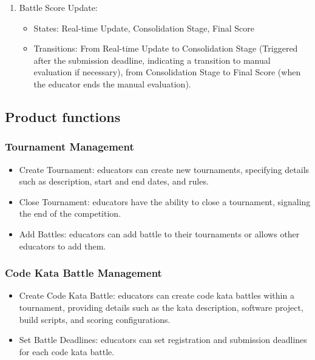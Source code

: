 \begin{enumerate}
    \item Battle Score Update:
        \begin{itemize}
            \item States: Real-time Update, Consolidation Stage, Final Score
            \item Transitions: From Real-time Update to Consolidation Stage (Triggered after the submission deadline, indicating a transition to manual evaluation if necessary), from Consolidation Stage to Final Score (when the educator ends the manual evaluation).
        \end{itemize}

    
\end{enumerate}

\subsection{Product functions}


\subsubsection{Tournament Management}
 \begin{itemize}
    \item Create Tournament: educators can create new tournaments, specifying details such as description, start and end dates, and rules.
    \item Close Tournament: educators have the ability to close a tournament, signaling the end of the competition.
    \item Add Battles: educators can add battle to their tournaments or allows other educators to add them.
\end{itemize}

\subsubsection{Code Kata Battle Management}
 \begin{itemize}
    \item Create Code Kata Battle: educators can create code kata battles within a tournament, providing details such as the kata description, software project, build scripts, and scoring configurations.
    \item Set Battle Deadlines: educators can set registration and submission deadlines for each code kata battle.
\end{itemize}

